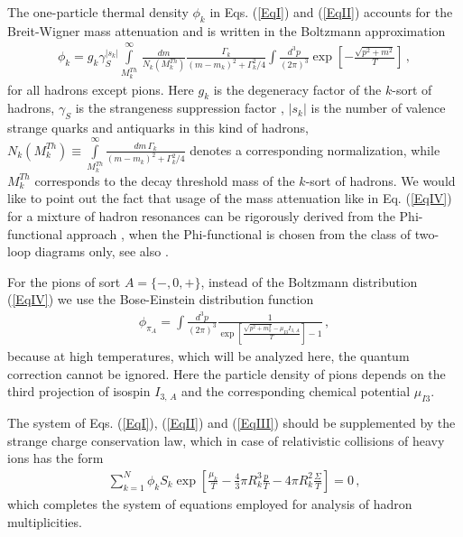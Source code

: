 \documentclass[12pt]{article}
\begin{document}
The one-particle thermal density $\phi_k$ in Eqs. (\ref{EqI}) and (\ref{EqII})  accounts for  the  Breit-Wigner  mass attenuation and is written in the Boltzmann approximation
%
\begin{eqnarray}
\label{EqIV}
\phi_k = g_k  \gamma_S^{|s_k|} \int\limits_{M_k^{Th}}^\infty  \,  \frac{ d m}{N_k (M_k^{Th})} 
\frac{\Gamma_{k}}{(m-m_{k})^{2}+\Gamma^{2}_{k}/4} 
\int \frac{d^3 p}{ (2 \pi)^3 }   \exp \left[ -\frac{ \sqrt{p^2 + m^2} }{T} \right] \,,
%
\end{eqnarray}
%
for all hadrons except pions. 
Here $g_k$ is the  degeneracy factor of the $k$-sort  of hadrons,
$\gamma_S$ is the strangeness suppression factor \cite{Rafelski}, $|s_k|$ is the number of valence  strange quarks and antiquarks  in this kind of hadrons, 
${N_k (M_k^{Th})} \equiv \int\limits_{M_k^{Th}}^\infty \frac{d m \, \Gamma_{k}}{(m-m_{k})^{2}+\Gamma^{2}_{k}/4} $ denotes 
a corresponding normalization, while $M_k^{Th}$ corresponds to the decay threshold mass of the $k$-sort of hadrons.
We would like to point out the fact that  usage of the   mass attenuation like  in Eq.  (\ref{EqIV})
for a mixture of  hadron resonances
can be rigorously derived   \cite{David:16A,David:16B} from  the Phi-functional approach \cite{Phi-approach},  when the
Phi-functional is chosen from the class of  two-loop diagrams only, see also \cite{Phi-approach2}.


For the pions of sort $A = \{-, 0, + \}$, instead of  the Boltzmann distribution (\ref{EqIV}) we use the Bose-Einstein distribution function 
%
\begin{eqnarray}
\label{EqV}
\phi_{\pi_A} =  \int \frac{d^3 p}{ (2 \pi)^3 }   \frac{1}{\exp \left[ \frac{ \sqrt{p^2 + m_\pi^2} - \mu_{I3} I_{3,\, A}}{T} \right]  - 1} \,,
%
\end{eqnarray}
%
because at high temperatures, which will be analyzed here, the quantum correction cannot be ignored.  Here the particle density of pions depends on the 
 third  projection of  isospin $I_{3,\, A}$ and  the corresponding chemical potential $\mu_{I3}$. 


The system of Eqs.  (\ref{EqI}), (\ref{EqII}) and  (\ref{EqIII}) should be supplemented by the strange charge conservation law,
which in case of relativistic collisions of heavy ions has the  form
%
\begin{eqnarray}
%
\label{EqVI}
\sum_{k=1}^N \phi_k S_k \exp \left[ \frac{\mu_k}{T} - \frac{4}{3}\pi R_k^3 \frac{p}{T} - 4\pi R_k^2 \frac{\Sigma}{T} \right] = 0 \,,
\end{eqnarray}
%
which completes the  system of equations employed for analysis of hadron multiplicities. 
\end{document}
